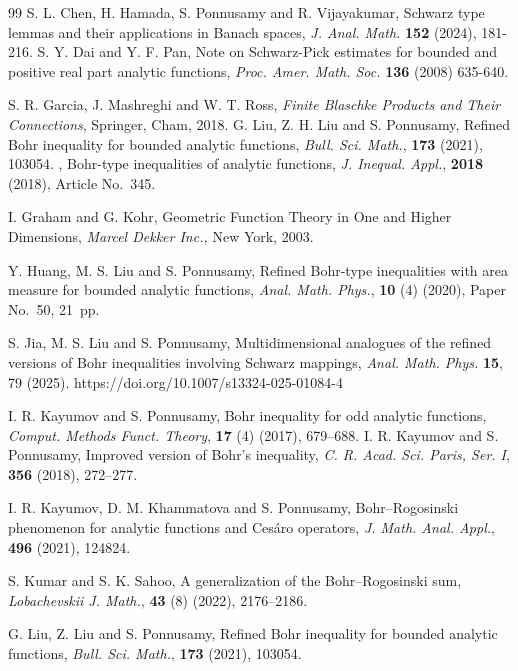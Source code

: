 \documentclass[11pt, reqno]{amsart}
\newtheorem*{cor A}{Corollary A}
\newtheorem*{cor B}{Corollary B}
\numberwithin{equation}{section}
\begin{document}
\begin{thebibliography}{99}
 {\sc S. L. Chen, H. Hamada, S. Ponnusamy and R. Vijayakumar,} Schwarz type lemmas and their
applications in Banach spaces, \textit{J. Anal. Math.} \textbf{152} (2024), 181-216.
  {\sc  S. Y. Dai  and Y. F. Pan}, Note on Schwarz-Pick estimates for bounded and positive real part
analytic functions, \textit{Proc. Amer. Math. Soc.} \textbf{136} (2008) 635-640.

 {\sc S. R. Garcia, J. Mashreghi and W. T. Ross}, \textit{Finite Blaschke Products and Their Connections},
Springer, Cham, 2018.
 {\sc G. Liu, Z. H. Liu and S. Ponnusamy}, Refined Bohr inequality for bounded analytic functions, \textit{Bull. Sci. Math.}, \textbf{173} (2021), 103054.
, Bohr-type inequalities of analytic functions, \textit{J. Inequal. Appl.}, \textbf{2018} (2018), Article No.~345.

 {\sc I. Graham and G. Kohr}, Geometric Function Theory in One and Higher Dimensions, \textit{Marcel Dekker Inc.,} New York, 2003.

 {\sc Y. Huang, M. S. Liu and S. Ponnusamy}, Refined Bohr-type inequalities with area measure for bounded analytic functions, \textit{Anal. Math. Phys.}, \textbf{10} (4) (2020), Paper No.~50, 21~pp.

 {\sc S. Jia, M. S. Liu and S. Ponnusamy}, Multidimensional analogues of the refined versions of Bohr inequalities involving Schwarz mappings, \textit{ Anal. Math. Phys. } \textbf{15}, 79 (2025). https://doi.org/10.1007/s13324-025-01084-4

 {\sc I. R. Kayumov and S. Ponnusamy}, Bohr inequality for odd analytic functions, \textit{Comput. Methods Funct. Theory}, \textbf{17} (4) (2017), 679--688.
 {\sc I. R. Kayumov and S. Ponnusamy}, Improved version of Bohr's inequality, \textit{C. R. Acad. Sci. Paris, Ser. I}, \textbf{356} (2018), 272--277.

 {\sc I. R. Kayumov, D. M. Khammatova and S. Ponnusamy}, Bohr--Rogosinski phenomenon for analytic functions and Ces\'aro operators, \textit{J. Math. Anal. Appl.}, \textbf{496} (2021), 124824. 

 {\sc S. Kumar and S. K. Sahoo}, A generalization of the Bohr--Rogosinski sum, \textit{Lobachevskii J. Math.}, \textbf{43} (8) (2022), 2176--2186.

 {\sc G. Liu, Z. Liu and S. Ponnusamy}, Refined Bohr inequality for bounded analytic functions, \textit{Bull. Sci. Math.}, \textbf{173} (2021), 103054.



\end{thebibliography}
\end{document}
